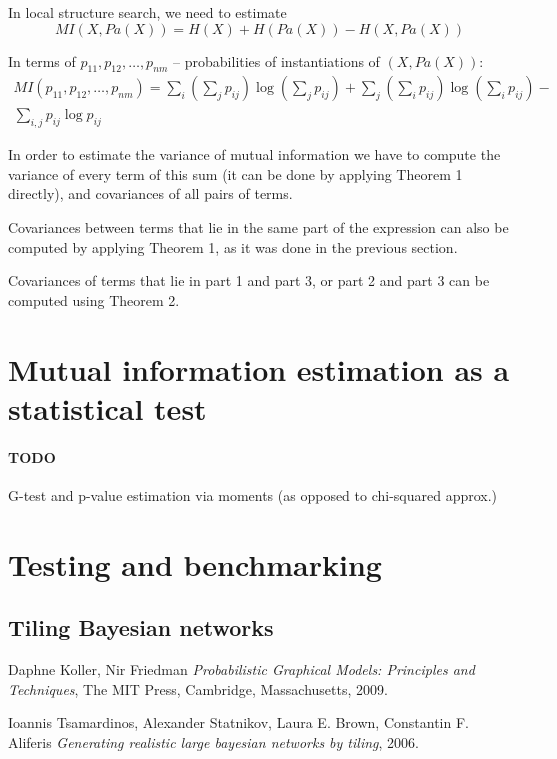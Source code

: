 \documentclass{article}
\begin{document}
In local structure search, we need to estimate
\begin{equation}
MI(X, Pa(X)) = H(X) + H(Pa(X)) - H(X, Pa(X))
\end{equation}

In terms of $p_{11}, p_{12}, \ldots, p_{nm}$ -- probabilities of instantiations of $(X, Pa(X))$:
\begin{multline}
MI(p_{11}, p_{12}, \ldots, p_{nm}) = \sum_i{(\sum_j{p_{ij}}) \log(\sum_j{p_{ij}})} + \sum_j{(\sum_i{p_{ij}}) \log(\sum_i{p_{ij}})} - \\ \sum_{i,j}{p_{ij} \log p_{ij}}
\end{multline}

In order to estimate the variance of mutual information we have to compute the variance of every term of this sum (it can be done by applying Theorem 1 directly), and covariances of all pairs of terms.

Covariances between terms that lie in the same part of the expression can also be computed by applying Theorem 1, as it was done in the previous section.

Covariances of terms that lie in part 1 and part 3, or part 2 and part 3 can be computed using Theorem 2.

\section{Mutual information estimation as a statistical test}
\paragraph{TODO} G-test and p-value estimation via moments (as opposed to chi-squared approx.)

\section{Testing and benchmarking}
\subsection{Tiling Bayesian networks \cite{Tsamardinos2006}}

\begin{thebibliography}{9}
	
	Daphne Koller, Nir Friedman
	\emph{Probabilistic Graphical Models: Principles and Techniques},
	The MIT Press, Cambridge, Massachusetts,
	2009.
	
	Ioannis Tsamardinos, Alexander Statnikov, Laura E. Brown, Constantin F. Aliferis
	\emph{Generating realistic large bayesian networks by tiling},
	2006.
	
	
	
\end{thebibliography}
\end{document}
